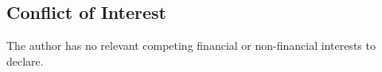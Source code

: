 \documentclass[pdflatex,sn-mathphys-num]{sn-jnl}%
\theoremstyle{thmstyleone}%
\theoremstyle{thmstyletwo}%
\theoremstyle{thmstylethree}%
\begin{document}
\subsection*{Conflict of Interest}
The author has no relevant competing financial or non-financial 
interests to declare.




















\end{document}
